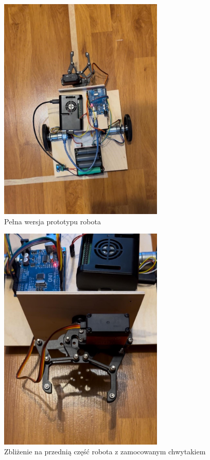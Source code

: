 \begin{figure}[H]
  \centering
  \includegraphics[width=0.7\textwidth]{./graf/proto-2.jpg}
  \caption{Pełna wersja prototypu robota}
  \label{fig:full-proto}
\end{figure}

\begin{figure}[H]
  \centering
  \includegraphics[width=0.7\textwidth]{./graf/proto-3.jpg}
  \caption{Zbliżenie na przednią część robota z zamocowanym chwytakiem}
  \label{fig:full-proto1}
\end{figure}

